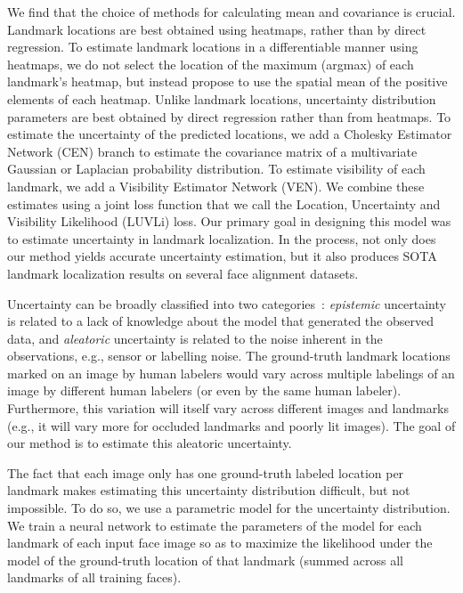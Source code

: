 \documentclass[10pt,twocolumn,letterpaper]{article}
\newcommand{\example}{{e.g.}}
\newcommand{\1}{{\bf 1}}
\newcommand{\0}{{\bf 0}}
\begin{document}
    We find that the choice of methods for calculating mean and covariance is crucial. Landmark locations are best obtained using heatmaps, rather than by direct regression. To estimate landmark locations in a differentiable manner using heatmaps, we do not select the location of the maximum (argmax) of each landmark's heatmap, but instead propose to use the spatial mean of the positive elements of each heatmap. Unlike landmark locations, uncertainty distribution parameters are best obtained by direct regression rather than from heatmaps. To estimate the uncertainty of the predicted locations, we add a Cholesky Estimator Network (CEN) branch to estimate the covariance matrix of a multivariate Gaussian or Laplacian probability distribution. To estimate visibility of each landmark, we add a Visibility Estimator Network (VEN). We combine these estimates using a joint loss function that we call the Location, Uncertainty and Visibility Likelihood (LUVLi) loss. Our primary goal in designing this model was to estimate uncertainty in landmark localization. In the process, not only does our method yields accurate uncertainty estimation, but it also produces SOTA landmark localization results on several face alignment datasets.

    Uncertainty can be broadly classified into two categories~\cite{kendall2017uncertainties}: \emph{epistemic} uncertainty is related to a lack of knowledge about the model that generated the observed data, and \emph{aleatoric} uncertainty
    is related to the noise inherent in the observations, \example, sensor or labelling noise. The ground-truth landmark locations marked on an image by human labelers would vary across multiple labelings of an image by different human labelers (or even by the same human labeler). Furthermore, this variation will itself vary across different images and landmarks (\example, it will vary more for occluded landmarks and poorly lit images). The goal of our method is to estimate this aleatoric uncertainty.
    
    The fact that each image only has one ground-truth labeled location per landmark makes estimating this uncertainty distribution difficult, but not impossible. To do so, we use a parametric model for the uncertainty distribution. We train a neural network to estimate the parameters of the model for each landmark of each input face image so as to maximize the likelihood under the model of the ground-truth location of that landmark (summed across all landmarks of all training faces).
\end{document}
